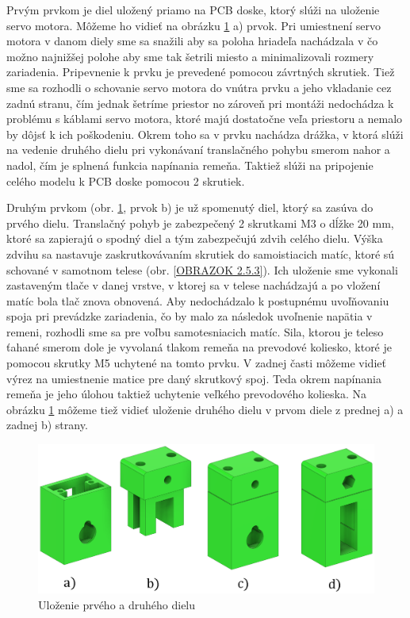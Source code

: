 Prvým prvkom je diel uložený priamo na PCB doske, ktorý slúži na uloženie servo motora. Môžeme ho vidieť na obrázku \ref{OBRAZOK 2.5.2} a) prvok.  Pri umiestnení servo motora v danom diely sme sa snažili aby sa poloha hriadeľa nachádzala v čo možno najnižšej polohe aby sme tak šetrili miesto a minimalizovali rozmery zariadenia. Pripevnenie k prvku je prevedené pomocou závrtných skrutiek. Tiež sme sa rozhodli o schovanie servo motora do vnútra prvku a jeho vkladanie cez zadnú stranu, čím jednak šetríme priestor no zároveň pri montáži nedochádza k problému s káblami servo motora, ktoré majú dostatočne veľa priestoru a nemalo by dôjsť k ich poškodeniu.  Okrem toho sa v prvku nachádza drážka, v ktorá slúži na vedenie druhého dielu pri vykonávaní translačného pohybu smerom nahor a nadol, čím je splnená funkcia napínania remeňa.  Taktiež slúži na pripojenie celého modelu k PCB doske pomocou 2 skrutiek.

Druhým prvkom (obr. \ref{OBRAZOK 2.5.2}, prvok b) je už spomenutý diel, ktorý sa zasúva do prvého dielu.  Translačný pohyb je zabezpečený 2 skrutkami M3 o dĺžke 20 mm, ktoré sa zapierajú o spodný diel a tým zabezpečujú zdvih celého dielu. Výška zdvihu sa nastavuje zaskrutkovávaním skrutiek do samoistiacich matíc, ktoré sú schované v samotnom telese (obr. \ref{OBRAZOK 2.5.3}). Ich uloženie sme vykonali zastaveným tlače v danej vrstve, v ktorej sa v telese nachádzajú a po vložení matíc bola tlač znova obnovená.  Aby nedochádzalo k postupnému uvoľňovaniu spoja pri prevádzke zariadenia, čo by malo za následok uvoľnenie napätia v remeni, rozhodli sme sa pre voľbu samotesniacich matíc. Sila, ktorou je teleso ťahané smerom dole je vyvolaná tlakom remeňa na prevodové koliesko, ktoré je pomocou skrutky M5 uchytené na tomto prvku. V zadnej časti môžeme vidieť výrez na umiestnenie matice pre daný skrutkový spoj. Teda okrem napínania remeňa je jeho úlohou taktiež uchytenie veľkého prevodového kolieska. Na obrázku \ref{OBRAZOK 2.5.2} môžeme tiež vidieť uloženie druhého dielu v prvom diele z prednej a) a zadnej b) strany.  

\begin{figure}[]
	\centering
	\includegraphics[width=150mm]{obr/3Dbase.eps}
	\caption{Uloženie prvého a druhého dielu}\label{OBRAZOK 2.5.2} 
\end{figure} 

